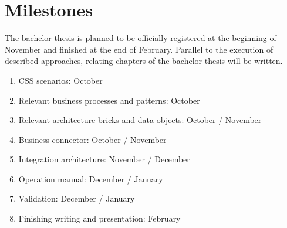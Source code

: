 \documentclass{article}
\begin{document}
\section{Milestones}

The bachelor thesis is planned to be officially registered at the beginning of November and finished at the end of February.
Parallel to the execution of described approaches, relating chapters of the bachelor thesis will be written.

\begin{enumerate}
    \item CSS scenarios: October
    \item Relevant business processes and patterns: October
    \item Relevant architecture bricks and data objects: October / November
    \item Business connector: October / November
    \item Integration architecture: November / December
    \item Operation manual: December / January
    \item Validation: December / January
    \item Finishing writing and presentation: February
\end{enumerate}

\printbibliography
\end{document}
